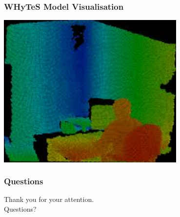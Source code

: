 
\begin{frame}
	\frametitle{WHyTeS Model Visualisation}
    \vspace{3mm}
    \href{run:./video/WHyTeS_visualisation.mp4}{\includegraphics[width=0.7\textwidth]{fig/grzegorz.jpeg}}
\end{frame}



\begin{frame}
	\frametitle{Questions}
	\begin{center}
		\vfill
		Thank you for your attention.\\
		\vfill
		Questions?
		\vfill
	\end{center}
\end{frame}




